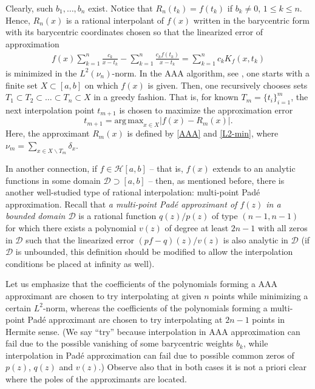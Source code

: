 \documentclass[twoside,a4paper]{amsart}
\theoremstyle{remark}
\begin{document}
Clearly, such $b_1,\ldots,b_n$ exist. Notice that \( R_n(t_k)=f(t_k) \) if \( b_k\neq 0 \), \( 1\leq k\leq n\). Hence, \( R_n(x) \) is a rational interpolant of \( f(x) \) written in the barycentric form with its barycentric coordinates chosen so that the linearized error of approximation
\begin{align}
\label{lin error}
f(x)\sum_{k=1}^n \frac{c_k}{x-t_k} - \sum_{k=1}^n \frac{c_k f(t_k)}{x-t_k} = \sum_{k=1}^n c_k K_f(x,t_k)
\end{align}
is minimized in the \( L^2(\nu_n)\)-norm. In the AAA algorithm, see \cite{AA,MR3805855,MR5088237}, one starts with a finite set $X\subset [a,b]$ on which $f(x)$ is given. Then, one recursively chooses sets \( T_1\subset T_2\subset\ldots \subset T_n\subset X \) in a greedy fashion. That is, for known $T_m=\{t_i\}_{i=1}^m$, the next interpolation point $t_{m+1}$ is chosen to maximize the approximation error
\[
t_{m+1} = \mathrm{arg \, max}_{x\in X} |f(x)-R_{m}(x)|.
\]
Here, the approximant $R_m(x)$ is defined by \eqref{AAA} and \eqref{L2-min}, where  \( {\nu_m}=\sum_{x\in X\backslash T_m} \delta_x \).

In another connection, if \( f\in\mathcal H[a,b] \) -- that is, \( f(x) \) extends to an analytic functions in some  domain $\mathcal{D}\supset[a,b]$ -- then, as mentioned before, there is another well-studied type of rational interpolation: multi-point Pad\'e approximation. Recall that \emph{a multi-point Pad\'e approximant of \( f(z) \) in a bounded domain $\mathcal{D}$} is a rational function \( q(z)/p(z) \) of type \((n-1,n-1)\) for which there exists a polynomial \( v(z) \) of degree at least \( 2n-1 \) with all zeros in \( \mathcal{D} \) such that the linearized error \( (pf-q)(z)/v(z)\) is also analytic in \( \mathcal{D} \) (if \( \mathcal D \) is unbounded, this definition should be modified to allow the interpolation conditions be placed at infinity as well). 

Let us emphasize that the coefficients of the polynomials forming a AAA approximant are chosen to try interpolating at given \( n \) points while minimizing a certain \( L^2\)-norm, whereas the coefficients of the polynomials forming a multi-point Pad\'e approximant are chosen to try interpolating at \( 2n-1 \) points in Hermite sense. (We say ``try'' because interpolation in AAA approximation can fail due to the possible vanishing of some  barycentric weights $b_k$, while interpolation in Pad\'e approximation can fail due to possible common zeros of \( p(z) \), \( q(z) \) and \( v(z) \).) Observe also that in both cases it is not a priori clear where the poles of the approximants are located.
\end{document}
